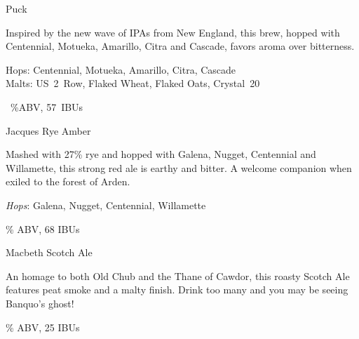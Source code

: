 \documentclass[12pt]{article}
\begin{document}
\setlength{\hoffset}{0pt}
\newlength{\colwidth}
\setlength{\colwidth}{0.3\textwidth}

\begin{center}

\begin{minipage}[t]{\colwidth}

\begin{center}

{\Huge Puck}

{\large
Inspired by the new wave of IPAs from New England, this brew, 
hopped with Centennial, Motueka, Amarillo, Citra and Cascade, 
favors aroma over bitterness.

\begin{flushleft}      
Hops: Centennial, Motueka, Amarillo, Citra, Cascade \\
Malts: US~2~Row, Flaked Wheat, Flaked Oats, Crystal~20
\end{flushleft}

~\%ABV, 57~IBUs
      }
      \end{center}
\end{minipage}
% 
\begin{minipage}[t]{\colwidth}
\begin{center}
  {\Huge Jacques Rye Amber}

{\large
  Mashed with 27\% rye and hopped with Galena, Nugget, Centennial 
  and Willamette, this strong red ale is earthy and bitter.  A welcome 
  companion when exiled to the forest of Arden.

  \textit{Hops}: Galena, Nugget, Centennial, Willamette

   \% ABV, 68 IBUs
}
\end{center}
\end{minipage}
%
\begin{minipage}[t]{\colwidth}
\begin{center}
  {\Huge Macbeth Scotch Ale}

{\large
  An homage to both Old Chub and the Thane of Cawdor, this roasty 
  Scotch Ale features peat smoke and a malty finish.  Drink too 
  many and you may be seeing Banquo's ghost!

   \% ABV, 25 IBUs
}
\end{center}
\end{minipage}

\end{center}
\end{document}
